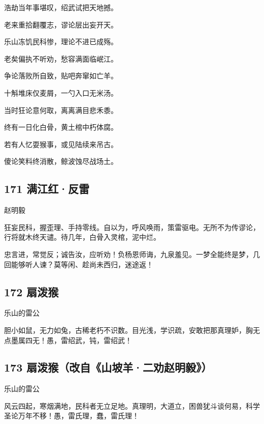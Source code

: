 浩劫当年事堪叹，绍武试把天地撼。

老来重拾翻覆志，谬论层出妄开天。

乐山冻饥民科惨，理论不进已成殇。

老矣偏执不听劝，愁容满面临岷江。

争论落败所自致，贴吧奔窜如亡羊。

十斛堆床仅麦屑，一勺入口无米汤。

当时狂论意何取，离离满目悲禾黍。

终有一日化白骨，黄土棺中朽体腐。

若有人忆耍猴事，或见陆续来吊古。

傻论笑料终消散，鲸波蚀尽战场土。

\hypertarget{ux6ee1ux6c5fux7ea2ux53cdux96f7}{%
\subsection{171 满江红·反雷}\label{ux6ee1ux6c5fux7ea2ux53cdux96f7}}

赵明毅

狂妄民科，握歪理、手持零线。自以为，呼风唤雨，策雷驱电。无所不为传谬论，行将就木终天谴。待几年，白骨入灵棺，泥中烂。

忠言进，常觉反；诚告汝，应听劝！负杨恩师诲，九泉羞见。一梦全能终是梦，几回能够听人谏？莫等闲、趁尚未西归，迷途返！
~\\

\hypertarget{ux6247ux6cfcux7334-6}{%
\subsection{172 扇泼猴}\label{ux6247ux6cfcux7334-6}}

乐山的雷公

胆小如鼠，无力如兔，古稀老朽不识数。目光浅，学识疏，安敢把那真理妒，胸无点墨属四无！愚，雷绍武，钝，雷绍武！
~\\

\hypertarget{ux6247ux6cfcux7334ux6539ux81eaux5c71ux5761ux7f8aux4e8cux529dux8d75ux660eux6bc5}{%
\subsection{173
扇泼猴（改自《山坡羊·二劝赵明毅》）}\label{ux6247ux6cfcux7334ux6539ux81eaux5c71ux5761ux7f8aux4e8cux529dux8d75ux660eux6bc5}}

乐山的雷公

风云四起，寒烟满地，民科者无立足地。真理明，大道立，困兽犹斗谈何易，科学圣论万年不移！愚，雷氏理，蠢，雷氏理！

